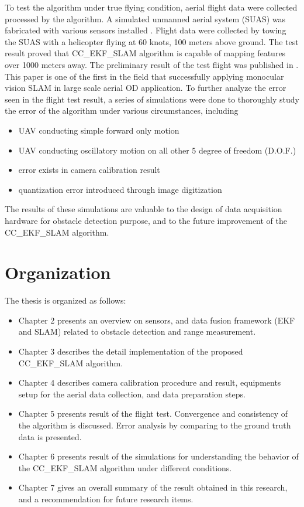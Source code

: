 To test the algorithm under true flying condition, aerial flight data were collected processed by the algorithm. A simulated unmanned aerial system (SUAS) was fabricated with various sensors installed . Flight data were collected by towing the SUAS with a helicopter flying at 60 knots, 100 meters above ground. The test result proved that CC\_EKF\_SLAM algorithm
is capable of mapping features over 1000 meters away. The preliminary
result of the test flight was published in \cite{zhang_obstacle_2012}.
This paper is one of the first in the field that successfully
applying monocular vision SLAM in large scale aerial OD application.
To further analyze the error seen in the flight test result, a series of simulations were done to thoroughly study
the error of the algorithm under various circumstances, including
\begin{itemize}
\item UAV conducting simple forward only motion
\item UAV conducting oscillatory motion on all other 5 degree of freedom (D.O.F.)
\item error exists in camera calibration result
\item quantization error introduced through image digitization 
\end{itemize}
The results of these simulations are
valuable to the design of data acquisition hardware for
obstacle detection purpose, and to the future improvement of the
CC\_EKF\_SLAM algorithm.

\section{Organization}\label{section:Organization}
The thesis is organized as follows:

\begin{itemize}
  \item Chapter 2 presents an overview on sensors, and data fusion
  framework (EKF and SLAM) related to obstacle detection and range measurement.
  \item Chapter 3 describes the detail implementation of the proposed
  CC\_EKF\_SLAM algorithm.
  \item Chapter 4 describes camera calibration procedure and result, equipments
  setup for the aerial data collection, and data preparation steps.
  \item Chapter 5 presents result of the flight test. Convergence and consistency of the algorithm is
  discussed. Error analysis by comparing to the ground truth data is presented. 
  \item Chapter 6 presents result of the simulations for understanding
  the behavior of the CC\_EKF\_SLAM algorithm under different
  conditions.  
  \item Chapter 7 gives an overall summary of the result obtained in
  this research, and a recommendation for future research items. 
\end{itemize}

